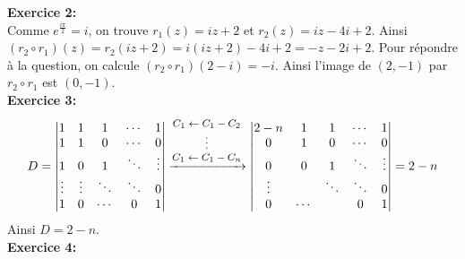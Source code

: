 \documentclass[a4paper, 10pt]{article}
\theoremstyle{plain}
\begin{document}
\bigskip
\noindent
\textbf{Exercice 2:}\\
Comme $e^{\frac{i\pi}{2}}=i$, 
on trouve 
$r_1(z)= iz+2$ et $r_2(z) = iz -4i+2$.
Ainsi 
$(r_2\circ r_1)(z) = r_2(iz+2) = i(iz+2)-4i+2 = -z-2i+2$.
Pour répondre à la question, on calcule 
$(r_2\circ r_1)( 2-i) = -i$.
Ainsi l'image de $(2,-1)$ par $r_2 \circ r_1$ est $(0,-1)$.\vspace{0.4cm}\\

\noindent
\textbf{Exercice 3:}\\
\[D = 
\begin{vmatrix}
1 & 1 & 1 & \cdots & 1 \\
1 & 1 & 0 & \cdots & 0 \\
1 & 0 & 1 & \ddots & \vdots \\
\vdots & \vdots & \ddots & \ddots & 0 \\
1 & 0 & \cdots & 0 &1
\end{vmatrix}
\xrightarrow{
\footnotesize
 \begin{matrix}
 C_1 \leftarrow C_1-C_2 \\
 \vdots \\
 C_1 \leftarrow C_1 -C_n
 \end{matrix}
 }
 \begin{vmatrix}
 2-n & 1 & 1 &\cdots & 1 \\
 0 & 1 & 0 &\cdots &0 \\
 0 & 0 & 1 & \ddots & \vdots \\
 \vdots &  & \ddots & \ddots & 0 \\
 0 & \cdots  & & 0 & 1 
 \end{vmatrix} 
 =2-n
\]
Ainsi $D=2-n$.
\vspace{0.4cm}\\
\noindent
\textbf{Exercice 4:}\\
\end{document}

